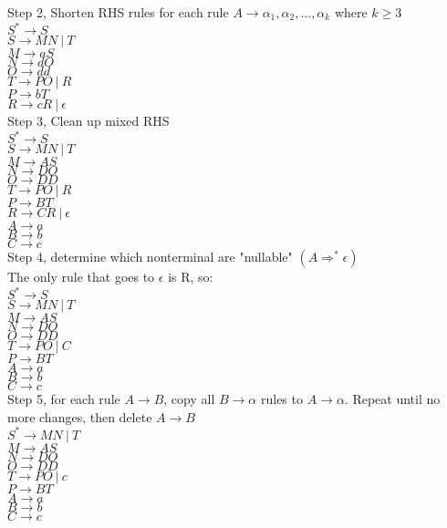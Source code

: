 \documentclass[10pt,letterpaper]{article}
\begin{document}
Step 2, Shorten RHS rules for each rule $A \rightarrow \alpha_1, \alpha_2,...,\alpha_k$
where $k \geq 3$\\
$S^* \rightarrow S$\\
$S \rightarrow MN\ |\ T$\\
$M \rightarrow aS$\\
$N \rightarrow dO$\\
$O \rightarrow dd$\\
$T \rightarrow PO\ |\ R$\\
$P \rightarrow bT$\\
$R \rightarrow cR\ |\ \epsilon$\\

Step 3, Clean up mixed RHS\\
$S^* \rightarrow S$\\
$S \rightarrow MN\ |\ T$\\
$M \rightarrow AS$\\
$N \rightarrow DO$\\
$O \rightarrow DD$\\
$T \rightarrow PO\ |\ R$\\
$P \rightarrow BT$\\
$R \rightarrow CR\ |\ \epsilon$\\
$A \rightarrow a$\\
$B \rightarrow b$\\
$C \rightarrow c$\\

Step 4, determine which nonterminal are "nullable" $(A \Rightarrow^* \epsilon)$\\
The only rule that goes to $\epsilon$ is R, so:\\
$S^* \rightarrow S$\\
$S \rightarrow MN\ |\ T$\\
$M \rightarrow AS$\\
$N \rightarrow DO$\\
$O \rightarrow DD$\\
$T \rightarrow PO\ |\ C$\\
$P \rightarrow BT$\\
$A \rightarrow a$\\
$B \rightarrow b$\\
$C \rightarrow c$\\

Step 5, for each rule $A \rightarrow B$, copy all $B \rightarrow \alpha$ rules to
$A \rightarrow \alpha$. Repeat until no more changes, then delete $A \rightarrow B$\\
$S^* \rightarrow MN\ |\ T$\\
$M \rightarrow AS$\\
$N \rightarrow DO$\\
$O \rightarrow DD$\\
$T \rightarrow PO\ |\ c$\\
$P \rightarrow BT$\\
$A \rightarrow a$\\
$B \rightarrow b$\\
$C \rightarrow c$\\
\end{document}
